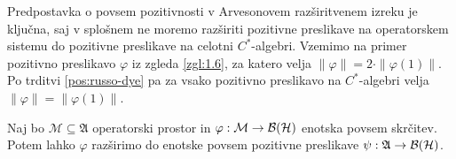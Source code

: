 \begin{opomba}
    Predpostavka o povsem pozitivnosti v Arvesonovem razširitvenem izreku je ključna,
    saj v splošnem ne moremo razširiti pozitivne preslikave na operatorskem sistemu do pozitivne preslikave na celotni $C^*$-algebri.
    Vzemimo na primer pozitivno preslikavo $\varphi$ iz zgleda \ref{zgl:1.6}, za katero velja $\| \varphi \| = 2 \cdot \| \varphi(1)\|$.
    Po trditvi \ref{pos:russo-dye} pa za vsako pozitivno preslikavo na $C^*$-algebri velja $\| \varphi \| = \| \varphi(1)\|$.
\end{opomba}

\begin{posledica}
    Naj bo $\mathcal{M} \subseteq \mathfrak{A}$ operatorski prostor in $\varphi: \mathcal{M} \to \operatorname{\mathcal{B} (\mathcal{H})}$ enotska povsem skrčitev.
    Potem lahko $\varphi$ razširimo do enotske povsem pozitivne preslikave $\psi: \mathfrak{A} \to \operatorname{\mathcal{B} (\mathcal{H})}$.
\end{posledica}



